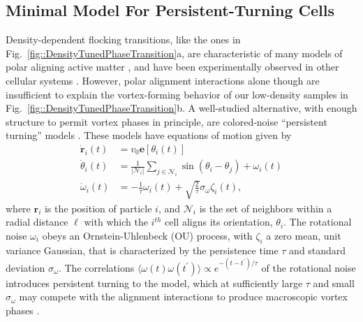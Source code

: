 \documentclass[reprint,unsortedaddress,amsmath,amssymb,aps,pre]{revtex4-2}
\begin{document}
\subsection{\label{SubSec::ColoredNoiseVicsekModel}Minimal Model For Persistent-Turning Cells}
Density-dependent flocking transitions, like the ones in Fig.~\ref{fig::DensityTunedPhaseTransition}a, 
are characteristic of many models of polar aligning active matter \cite{chate2008collective}, and have been experimentally observed in other cellular systems \cite{szabo2006phase}. However, polar alignment interactions alone though are insufficient to explain the vortex-forming behavior of our low-density samples in Fig.~\ref{fig::DensityTunedPhaseTransition}b. A well-studied alternative, with enough structure to permit vortex phases in principle, are colored-noise ``persistent turning'' models \cite{2012_Nagai,nagai2015collective,sugi2019c,xu2024self}. These models have equations of motion given by
\begin{align}
        \label{Eq::Pos_update}
        \Dot{\mathbf{r}}_i(t)&=v_0\mathbf{e}[\theta_i(t)]
        \\
        \label{Eq::Ori_update}
        \Dot{\theta}_i(t)&=\frac{1}{|\mathcal{N}_i|}
        \sum_{j\in\mathcal{N}_i}\sin(\theta_i-\theta_j) + \omega_i(t)
        \\
        \label{Eq::Omega_update}
        \Dot{\omega}_i(t)&=-\frac{1}{\tau}\omega_i(t)
        + \sqrt{\frac{2}{\tau}}\sigma_{\omega}\zeta_i(t),
\end{align}
where $\mathbf{r}_i$ is the position of particle $i$, and $\mathcal{N}_i$ is the set of neighbors within a radial distance $\ell$ with which the  $i^{th}$ cell aligns its orientation, $\theta_i$. The rotational noise $\omega_i$ obeys an Ornstein-Uhlenbeck (OU) process, with $\zeta_i$ a zero mean, unit variance Gaussian, that is characterized by the persistence time $\tau$ and standard deviation $\sigma_{\omega}$. The correlations $\langle{\omega(t)\omega(t^{\prime})}\rangle\propto e^{-(t-t^{\prime})/\tau}$ of the rotational noise introduces persistent turning to the model, which at sufficiently large $\tau$ and small $\sigma_{\omega}$ may compete with the alignment interactions to produce macroscopic vortex phases \cite{nagai2015collective}.
\end{document}
